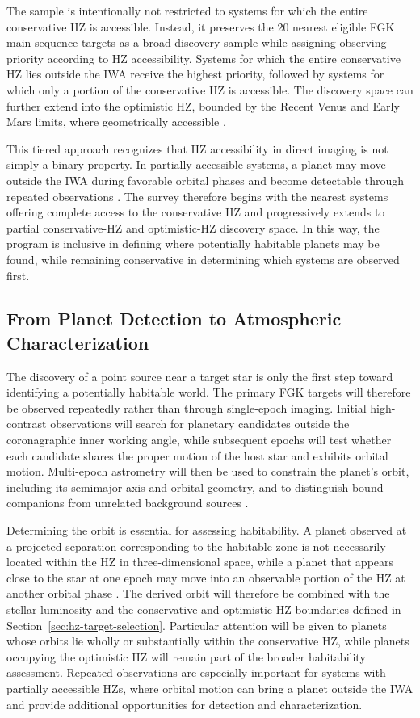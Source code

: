 The sample is intentionally not restricted to systems for which the entire
conservative HZ is accessible. Instead, it preserves the 20 nearest eligible FGK
main-sequence targets as a broad discovery sample while assigning observing priority
according to HZ accessibility. Systems for which the entire conservative HZ lies
outside the IWA receive the highest priority, followed by systems for which only
a portion of the conservative HZ is accessible. The discovery space can further
extend into the optimistic HZ, bounded by the Recent Venus and Early Mars limits,
where geometrically accessible \cite{kopparapu13}.

This tiered approach recognizes that HZ accessibility in direct imaging is not
simply a binary property. In partially accessible systems, a planet may move outside
the IWA during favorable orbital phases and become detectable through repeated
observations \cite{GuimondCowan2019}. The survey therefore begins with the nearest
systems offering complete access to the conservative HZ and progressively extends
to partial conservative-HZ and optimistic-HZ discovery space. In this way, the
program is inclusive in defining where potentially habitable planets may be found,
while remaining conservative in determining which systems are observed first.


\subsection{From Planet Detection to Atmospheric Characterization}
\label{sec:Detect_Char}

The discovery of a point source near a target star is only the first step toward
identifying a potentially habitable world. The primary FGK targets will therefore
be observed repeatedly rather than through single-epoch imaging. Initial
high-contrast observations will search for planetary candidates outside the
coronagraphic inner working angle, while subsequent epochs will test whether each
candidate shares the proper motion of the host star and exhibits orbital motion.
Multi-epoch astrometry will then be used to constrain the planet's orbit, including
its semimajor axis and orbital geometry, and to distinguish bound companions from
unrelated background sources \cite{GuimondCowan2019}.

Determining the orbit is essential for assessing habitability. A planet observed
at a projected separation corresponding to the habitable zone is not necessarily
located within the HZ in three-dimensional space, while a planet that appears close
to the star at one epoch may move into an observable portion of the HZ at another
orbital phase \cite{GuimondCowan2019}. The derived orbit will therefore be combined
with the stellar luminosity and the conservative and optimistic HZ boundaries
defined in Section~\ref{sec:hz-target-selection}. Particular attention will be given to planets whose orbits lie wholly or substantially within the conservative HZ, while planets occupying the optimistic HZ will remain part of the broader habitability assessment. Repeated observations are especially important for systems with partially accessible HZs, where orbital motion can bring a planet outside the IWA and provide additional opportunities for detection and characterization.


